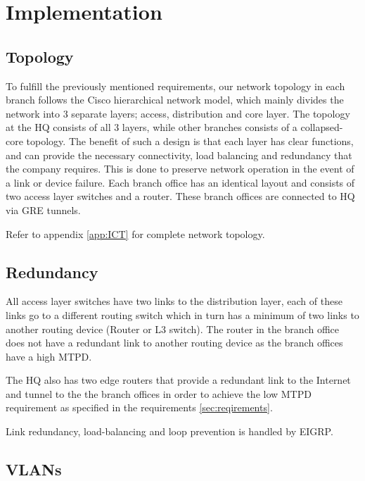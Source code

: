 \chapter{Implementation}
\label{chap:implementation}

\section{Topology}

To fulfill the previously mentioned requirements, our network topology in each branch follows the Cisco hierarchical network model, which mainly divides the network into 3 separate layers; access, distribution and core layer.
The topology at the HQ consists of all 3 layers, while other branches consists of a collapsed-core topology. 
The benefit of such a design is that each layer has clear functions, and can provide the necessary connectivity, load balancing and redundancy that the company requires. %
This is done to preserve network operation in the event of a link or device failure.
Each branch office has an identical layout and consists of two access layer switches and a router.
These branch offices are connected to HQ via GRE tunnels.

Refer to appendix \ref{app:ICT} for complete network topology.

\section{Redundancy}

All access layer switches have two links to the distribution layer, each of these links go to a different routing switch which in turn has a minimum of two links to another routing device (Router or L3 switch).
The router in the branch office does not have a redundant link to another routing device as the branch offices have a high MTPD.

The HQ also has two edge routers that provide a redundant link to the Internet and tunnel to the the branch offices in order to achieve the low MTPD requirement as specified in the requirements \ref{sec:reqirements}.

Link redundancy, load-balancing and loop prevention is handled by EIGRP.

\section{VLANs}
